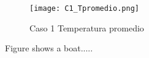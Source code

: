 \documentclass{article}
\begin{document}
\begin{figure}
  \texttt{[image: C1\_Tpromedio.png]}
  \caption{Caso 1 Temperatura promedio}
  
\end{figure}

Figure  shows a boat.....
\end{document}
